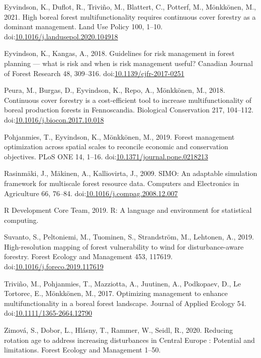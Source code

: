 \documentclass[]{elsarticle} %
\begin{document}
\leavevmode\hypertarget{ref-Eyvindson2021}{}%
Eyvindson, K., Duflot, R., Triviño, M., Blattert, C., Potterf, M., Mönkkönen, M., 2021. High boreal forest multifunctionality requires continuous cover forestry as a dominant management. Land Use Policy 100, 1--10. doi:\href{https://doi.org/10.1016/j.landusepol.2020.104918}{10.1016/j.landusepol.2020.104918}

\leavevmode\hypertarget{ref-Eyvindson2018}{}%
Eyvindson, K., Kangas, A., 2018. Guidelines for risk management in forest planning --- what is risk and when is risk management useful? Canadian Journal of Forest Research 48, 309--316. doi:\href{https://doi.org/10.1139/cjfr-2017-0251}{10.1139/cjfr-2017-0251}

\leavevmode\hypertarget{ref-Peura2018}{}%
Peura, M., Burgas, D., Eyvindson, K., Repo, A., Mönkkönen, M., 2018. Continuous cover forestry is a cost-efficient tool to increase multifunctionality of boreal production forests in Fennoscandia. Biological Conservation 217, 104--112. doi:\href{https://doi.org/10.1016/j.biocon.2017.10.018}{10.1016/j.biocon.2017.10.018}

\leavevmode\hypertarget{ref-Pohjanmies2019}{}%
Pohjanmies, T., Eyvindson, K., Mönkkönen, M., 2019. Forest management optimization across spatial scales to reconcile economic and conservation objectives. PLoS ONE 14, 1--16. doi:\href{https://doi.org/10.1371/journal.pone.0218213}{10.1371/journal.pone.0218213}

\leavevmode\hypertarget{ref-Rasinmaki2009}{}%
Rasinmäki, J., Mäkinen, A., Kalliovirta, J., 2009. SIMO: An adaptable simulation framework for multiscale forest resource data. Computers and Electronics in Agriculture 66, 76--84. doi:\href{https://doi.org/10.1016/j.compag.2008.12.007}{10.1016/j.compag.2008.12.007}

\leavevmode\hypertarget{ref-RDevelopmentCoreTeam2019}{}%
R Development Core Team, 2019. R: A language and environment for statistical computing.

\leavevmode\hypertarget{ref-Suvanto2019}{}%
Suvanto, S., Peltoniemi, M., Tuominen, S., Strandström, M., Lehtonen, A., 2019. High-resolution mapping of forest vulnerability to wind for disturbance-aware forestry. Forest Ecology and Management 453, 117619. doi:\href{https://doi.org/10.1016/j.foreco.2019.117619}{10.1016/j.foreco.2019.117619}

\leavevmode\hypertarget{ref-Trivino2017}{}%
Triviño, M., Pohjanmies, T., Mazziotta, A., Juutinen, A., Podkopaev, D., Le Tortorec, E., Mönkkönen, M., 2017. Optimizing management to enhance multifunctionality in a boreal forest landscape. Journal of Applied Ecology 54. doi:\href{https://doi.org/10.1111/1365-2664.12790}{10.1111/1365-2664.12790}

\leavevmode\hypertarget{ref-Zimova2020}{}%
Zimová, S., Dobor, L., Hlásny, T., Rammer, W., Seidl, R., 2020. Reducing rotation age to address increasing disturbances in Central Europe : Potential and limitations. Forest Ecology and Management 1--50.
\end{document}
